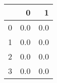 \begin{tabular}{lrr}
\toprule
{} &    0 &    1 \\
\midrule
0 &  0.0 &  0.0 \\
1 &  0.0 &  0.0 \\
2 &  0.0 &  0.0 \\
3 &  0.0 &  0.0 \\
\bottomrule
\end{tabular}
